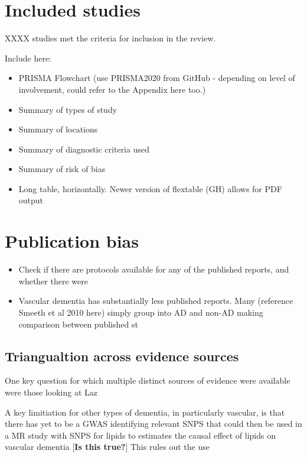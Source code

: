 \documentclass[a4paper, twoside]{templates/ociamthesis}
\providecommand{\tightlist}{%
  \setlength{\itemsep}{0pt}\setlength{\parskip}{0pt}}
\begin{document}
\hypertarget{included-studies}{%
\section{Included studies}\label{included-studies}}

XXXX studies met the criteria for inclusion in the review.

Include here:

\begin{itemize}
\item
  PRISMA Flowchart (use PRISMA2020 from GitHub - depending on level of involvement, could refer to the Appendix here too.)
\item
  Summary of types of study
\item
  Summary of locations
\item
  Summary of diagnostic criteria used
\item
  Summary of risk of bias
\item
  Long table, horizontally. Newer version of flextable (GH) allows for PDF output
\end{itemize}

\hypertarget{publication-bias}{%
\section{Publication bias}\label{publication-bias}}

\begin{itemize}
\tightlist
\item
  Check if there are protocols available for any of the published reports, and whether there were
\item
  Vascular dementia has substantially less published reports. Many (reference Smeeth et al 2010 here) simply group into AD and non-AD making comparison between published st
\end{itemize}

\hypertarget{triangualtion-across-evidence-sources}{%
\subsection{Triangualtion across evidence sources}\label{triangualtion-across-evidence-sources}}

One key question for which multiple distinct sources of evidence were available were those looking at Laz

A key limitiation for other types of dementia, in particularly vascular, is that there has yet to be a GWAS identifying relevant SNPS that could then be used in a MR study with SNPS for lipids to estimates the causal effect of lipids on vascular dementia {[}\textbf{Is this true?}{]} This rules out the use
\end{document}
